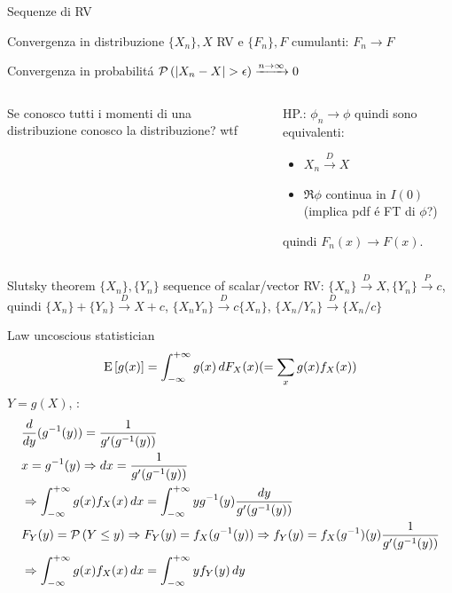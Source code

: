 \documentclass[asd-beamer.tex]{subfiles}
\begin{document}
\begin{frame}{Sequenze di RV}\frameintoc
\begin{block}{Convergenza in distribuzione}
$\{X_n\}, X$ RV e $\{F_n\}, F$ cumulanti: $F_n\to F$
\end{block}
\begin{block}{Convergenza in probabilit\'a}
$\prob{(|X_n-X|>\epsilon)}\xrightarrow{n\to\infty}0$
\end{block}
\begin{block}{}
\begin{columns}[T]
	\begin{column}{0.3\textwidth}
		Se conosco tutti i momenti di una distribuzione conosco la distribuzione? wtf
	\end{column}
	\begin{column}{0.7\textwidth}
	HP.: $\phi_n\to\phi$ quindi sono equivalenti:
		\begin{itemize}
			\item $X_n\xrightarrow{D}X$
			\item $\Re{\phi}$ continua in $I(0)$ (implica pdf \'e FT di $\phi$?)
		\end{itemize}
		quindi $F_n(x)\to F(x)$.
	\end{column}
\end{columns}
\end{block}
\begin{block}{Slutsky theorem}
$\{X_n\},\{Y_n\}$ sequence of scalar/vector RV: $\{X_n\}\xrightarrow{D}X,\{Y_n\}\xrightarrow{P}c$, quindi $\{X_n\}+\{Y_n\}\xrightarrow{D}X+c$, $\{X_nY_n\}\xrightarrow{D}c\{X_n\}$, $\{X_n/Y_n\}\xrightarrow{D}\{X_n/c\}$
\end{block}
\end{frame}

\begin{frame}{Law uncoscious statistician}
	\begin{equation*}
	\operatorname{E}{[g(x)]}=\int_{-\infty}^{+\infty}{}g(x)\,dF_X(x)(=\sum_xg(x)f_X(x))
	\end{equation*}
	$Y=g(X)$, :
	\begin{align*}
	&\frac{d}{d y}({g}^{-1}(y))=\frac{1}{g'({g}^{-1}(y))}\\
	&x={g}^{-1}(y)\Rightarrow dx=\frac{1}{g'({g}^{-1}(y))}\\
	&\Rightarrow \int_{-\infty}^{+\infty}{}g(x)f_X(x)\,dx=\int_{-\infty}^{+\infty}{}y{g}^{-1}(y)\frac{dy}{g'({g}^{-1}(y))}\\
	&F_Y(y)=\operatorname{\mathcal{P}}{(Y\leq y)}\Rightarrow F_Y(y)=f_X({g}^{-1}(y))\Rightarrow f_Y(y)=f_X({g}^{-1})(y)\frac{1}{g'({g}^{-1}(y))}\\
	&\Rightarrow \int_{-\infty}^{+\infty}{}g(x)f_X(x)\,dx=\int_{-\infty}^{+\infty} yf_Y(y)\,dy
	\end{align*}
\end{frame}
\end{document}
